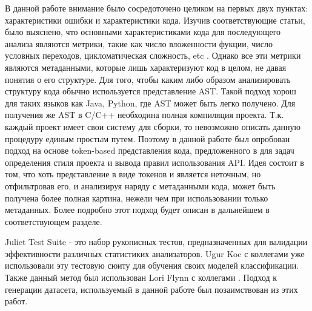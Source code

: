 В данной работе внимание было сосредоточено целиком на первых двух пунктах: характеристики ошибки и характеристики кода. Изучив соответствующие статьи, было выяснено, что основными характеристиками кода для последующего анализа являются метрики, такие как число вложенности фукции, число условных переходов, цикломатическая сложность, etc \cite{test-suites-for-dataset}. Однако все эти метрики являются метаданными, которые лишь характеризуют код в целом, не давая понятия о его структуре. Для того, чтобы каким либо образом анализировать структуру кода обычно используется представление AST\cite{Shedko2020ApplyingPM}. Такой подход хорош для таких языков как Java, Python, где AST может быть легко получено. Для получения же AST в C/C++ необходина полная компиляция проекта. Т.к. каждый проект имеет свои систему для сборки, то невозможно описать данную процедуру единым простым путем. Поэтому в данной работе был опробован подход на основе token-based представления кода, предложенного в \cite{Shedko2020ApplyingPM} для задач определения стиля проекта и вывода правил использования API. Идея состоит в том, что хоть представление в виде токенов и является неточным, но отфильтровав его, и анализируя наряду с метаданными кода, может быть получена более полная картина, нежели чем при использовании только метаданных. Более подробно этот подход будет описан в дальнейшем в соответствующем разделе.

Juliet Test Suite - это набор рукописных тестов, предназначенных для валидации эффективности различных статистиких анализаторов\cite{Juliet}. Ugur Koc с коллегами уже использовали эту тестовую сюиту для обучения своих моделей классификации. Также данный метод был использован Lori Flynn с коллегами \cite{test-suites-for-dataset}. Подход к генерации датасета, используемый в данной работе был позаимствован из этих работ.

\newpage